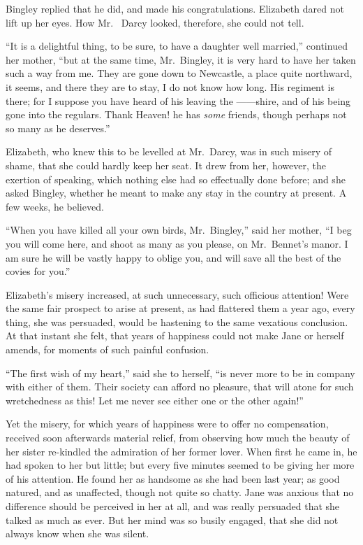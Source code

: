 Bingley replied that he did, and made his congratulations.
Elizabeth dared not lift up her eyes. How Mr.\ %
Darcy looked, therefore, she could not tell.

“It is a delightful thing, to be sure, to have a daughter
well married,” continued her mother, “but at the same
time, Mr.\ Bingley, it is very hard to have her taken such
a way from me. They are gone down to Newcastle, a place
quite northward, it seems, and there they are to stay,
I do not know how long. His regiment is there; for I
suppose you have heard of his leaving the \hbox{------shire}, and
of his being gone into the regulars. Thank Heaven! he
has \textit{some} friends, though perhaps not so many as he
deserves.”

Elizabeth, who knew this to be levelled at Mr.\ Darcy,
was in such misery of shame, that she could hardly keep
her seat. It drew from her, however, the exertion of
speaking, which nothing else had so effectually done
before; and she asked Bingley, whether he meant to
make any stay in the country at present. A few weeks,
he believed.

“When you have killed all your own birds, Mr.\ Bingley,”
said her mother, “I beg you will come here, and shoot
as many as you please, on Mr.\ Bennet’s manor. I am
sure he will be vastly happy to oblige you, and will save
all the best of the covies for you.”

Elizabeth’s misery increased, at such unnecessary, such
officious attention! Were the same fair prospect to arise
at present, as had flattered them a year ago, every thing,
she was persuaded, would be hastening to the same
vexatious conclusion. At that instant she felt, that years
of happiness could not make Jane or herself amends, for
moments of such painful confusion.

“The first wish of my heart,” said she to herself, “is
never more to be in company with either of them. Their
society can afford no pleasure, that will atone for such
wretchedness as this! Let me never see either one or the
other again!”

Yet the misery, for which years of happiness were to
offer no compensation, received soon afterwards material
relief, from observing how much the beauty of her sister
re-kindled the admiration of her former lover. When
first he came in, he had spoken to her but little; but
every five minutes seemed to be giving her more of his
attention. He found her as handsome as she had been
last year; as good natured, and as unaffected, though
not quite so chatty. Jane was anxious that no difference
should be perceived in her at all, and was really persuaded
that she talked as much as ever. But her mind was so
busily engaged, that she did not always know when she
was silent.

